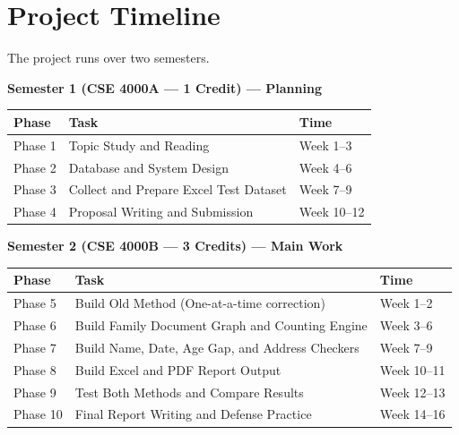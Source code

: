 \documentclass[12pt, a4paper]{article}
\begin{document}
\section{Project Timeline}

The project runs over two semesters.

\vspace{0.4cm}
\textbf{Semester 1 (CSE 4000A --- 1 Credit) --- Planning}

\begin{center}
\begin{tabular}{|l|l|l|}
    \hline
    \textbf{Phase} & \textbf{Task} & \textbf{Time} \\
    \hline
    Phase 1 & Topic Study and Reading & Week 1--3 \\
    \hline
    Phase 2 & Database and System Design & Week 4--6 \\
    \hline
    Phase 3 & Collect and Prepare Excel Test Dataset & Week 7--9 \\
    \hline
    Phase 4 & Proposal Writing and Submission & Week 10--12 \\
    \hline
\end{tabular}
\end{center}

\vspace{0.4cm}
\textbf{Semester 2 (CSE 4000B --- 3 Credits) --- Main Work}

\begin{center}
\begin{tabular}{|l|l|l|}
    \hline
    \textbf{Phase} & \textbf{Task} & \textbf{Time} \\
    \hline
    Phase 5 & Build Old Method (One-at-a-time correction) & Week 1--2 \\
    \hline
    Phase 6 & Build Family Document Graph and Counting Engine & Week 3--6 \\
    \hline
    Phase 7 & Build Name, Date, Age Gap, and Address Checkers & Week 7--9 \\
    \hline
    Phase 8 & Build Excel and PDF Report Output & Week 10--11 \\
    \hline
    Phase 9 & Test Both Methods and Compare Results & Week 12--13 \\
    \hline
    Phase 10 & Final Report Writing and Defense Practice & Week 14--16 \\
    \hline
\end{tabular}
\end{center}
\end{document}
